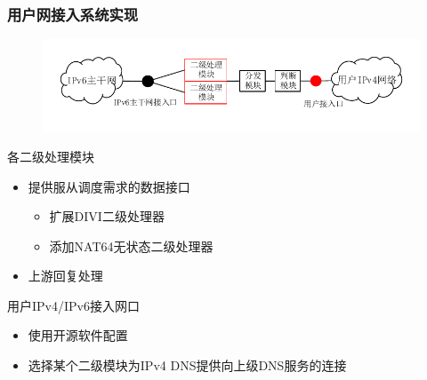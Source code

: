 \documentclass{beamer}
\begin{document}
\begin{frame}
  \frametitle{用户网接入系统实现}
  \vspace{-1em}
  \begin{figure}
    \includegraphics[width=\textwidth]{figs/10-user-access-point-d.pdf}
  \end{figure}
  \vspace{-2em}

  \begin{block}{各二级处理模块}
    \begin{itemize}
    \item 提供服从调度需求的数据接口
      \begin{itemize}
      \item 扩展DIVI二级处理器
      \item 添加NAT64无状态二级处理器
      \end{itemize}
    \item 上游回复处理
    \end{itemize}
  \end{block}

  \begin{block}{用户IPv4/IPv6接入网口}
    \begin{itemize}
    \item 使用开源软件配置
    \item 选择某个二级模块为IPv4 DNS提供向上级DNS服务的连接
    \end{itemize}
  \end{block}
\end{frame}
\end{document}
